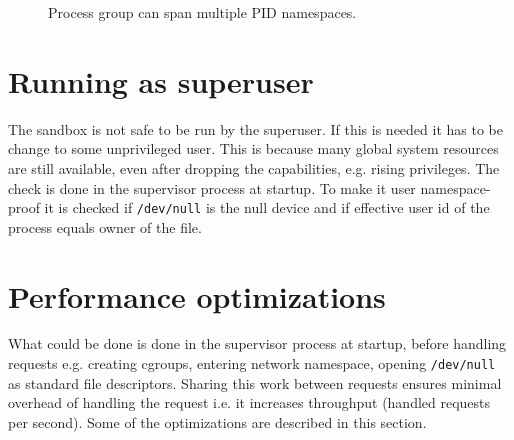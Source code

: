 \documentclass[en]{pracamgr}
\begin{document}
\begin{figure}[h]
\tikzset{>=latex} %
\centering
{}
\caption{Process group can span multiple PID namespaces.}
\label{fig:pgid_and_pid_namespace}
\end{figure}

\section{Running as superuser}

The sandbox is not safe to be run by the superuser. If this is needed it has to be change to some unprivileged user. This is because many global system resources are still available, even after dropping the capabilities, e.g. rising privileges. The check is done in the supervisor process at startup. To make it user namespace-proof it is checked if \texttt{/dev/null} is the null device and if effective user id of the process equals owner of the file.

\section{Performance optimizations}

What could be done is done in the supervisor process at startup, before handling requests e.g. creating cgroups, entering network namespace, opening \texttt{/dev/null} as standard file descriptors. Sharing this work between requests ensures minimal overhead of handling the request i.e. it increases throughput (handled requests per second). Some of the optimizations are described in this section.
\end{document}
